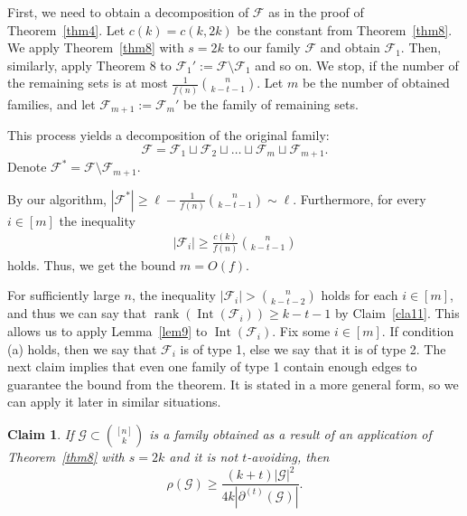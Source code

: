 \documentclass[12pt,a4paper]{article}
\newcommand{\ff}{\mathcal{F}}
\newcommand{\cG}{\mathcal{G}}
\newtheorem{Claim}[Theorem]{Claim}
\begin{document}
First, we need to obtain a decomposition of $\mathcal{F}$ as in the proof of Theorem~\ref{thm4}. Let $c(k) = c(k,2k)$ be the constant from Theorem~\ref{thm8}. We apply Theorem~\ref{thm8} with $s=2k$ to our family $\mathcal{F}$ and obtain $\mathcal{F}_1$. Then, similarly, apply Theorem 8 to $\ff_1' := \mathcal{F} \setminus \mathcal{F}_1$ and so on. We stop, if the number of the remaining sets is at most $\frac{1}{f(n)} \binom{n}{k-t-1}$. Let $m$ be the number of obtained families, and let $\mathcal{F}_{m+1} := \ff_m'$ be the family of remaining sets.  

This process yields a decomposition of the original family:
\[
\mathcal{F} = \mathcal{F}_1 \sqcup \mathcal{F}_2 \sqcup \ldots \sqcup \mathcal{F}_m \sqcup \mathcal{F}_{m+1}.
\]
Denote $\mathcal{F}^* = \mathcal{F} \setminus \mathcal{F}_{m+1}$. 

By our algorithm, $|\mathcal{F}^*| \geqslant \ell - \frac{1}{f(n)} \binom{n}{k-t-1} \sim \ell.$ Furthermore, for every $i\in[m]$ the inequality 
\begin{align}
|\mathcal{F}_i| \geqslant \frac{c(k)}{f(n)} \binom{n}{k-t-1}
\end{align}
holds. Thus, we get the bound $m =O (f)$.


For sufficiently large $n$, the inequality $|\ff_i| > \binom{n}{k-t-2}$ holds for each $i \in [m]$, and thus we can say that $\operatorname{rank}(\operatorname{Int}(\mathcal{F}_i)) \geqslant k-t-1$ by Claim~\ref{cla11}. This allows us to apply Lemma~\ref{lem9} to $\operatorname{Int}(\ff_i)$. Fix some $i \in [m]$. If condition (a) holds, then we say that $\mathcal{F}_i$ is of type 1, else we say that it is of type 2. The next claim implies that even one family of type 1 contain enough edges to guarantee the bound from the theorem. It is stated in a more general form, so we can apply it later in similar situations.

\begin{Claim}\label{cla12}
If $\cG \subset \binom{[n]}{k}$ is a family obtained as a result of an application of Theorem~\ref{thm8} with $s=2k$ and it is not $t$-avoiding, then 
$$\rho(\cG) \geqslant \frac{(k+t)|\cG|^2}{4k|\partial^{(t)}(\cG)|}.$$
\end{Claim}
\end{document}

